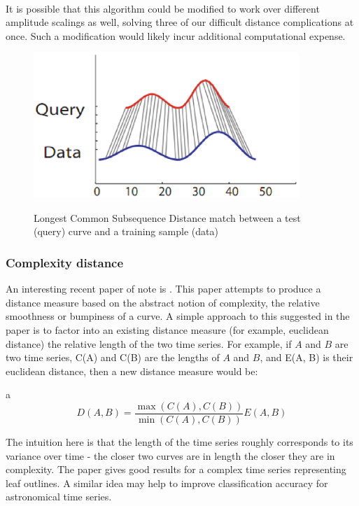 	\paragraph{}
	It is possible that this algorithm could be modified to work over different amplitude scalings as well, solving three of our difficult distance complications at once. Such a modification would likely incur additional computational expense. 
	
	\begin{figure}[h!]
	\centering
	\includegraphics[width=100mm]{images/lcss.eps}
	\label{fig:lcss}
	\caption{Longest Common Subsequence Distance match between a test (query) curve and a training sample (data)}
	\end{figure}
	
	\subsubsection{Complexity distance} 
	An interesting recent paper of note is \citep{batista2011complexity}. This paper attempts to produce a distance measure based on the abstract notion of complexity, the relative smoothness or bumpiness of a curve. A simple approach to this suggested in the paper is to factor into an existing distance measure (for example, euclidean distance) the relative length of the two time series. For example, if $A$ and $B$ are two time series, C(A) and C(B) are the lengths of $A$ and $B$, and E(A, B) is their euclidean distance, then a new distance measure would be:
	\begin{center}a
	\begin{equation*}
		D(A,B) = \frac{\max(C(A), C(B))}{\min(C(A), C(B))}E(A,B)
	\end{equation*}
	\end{center}
	 The intuition here is that the length of the time series roughly corresponds to its variance over time - the closer two curves are in length the closer they are in complexity. The paper gives good results for a complex time series representing leaf outlines. A similar idea may help to improve classification accuracy for astronomical time series.
	

